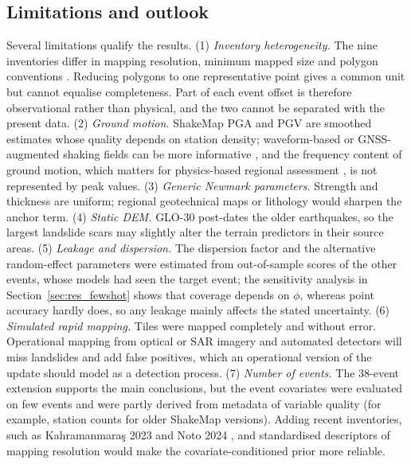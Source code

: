 \subsection{Limitations and outlook}
Several limitations qualify the results. (1) \emph{Inventory heterogeneity.} The nine inventories differ in mapping resolution, minimum mapped size and polygon conventions \citep{tanyas2017}. Reducing polygons to one representative point gives a common unit but cannot equalise completeness. Part of each event offset is therefore observational rather than physical, and the two cannot be separated with the present data. (2) \emph{Ground motion.} ShakeMap PGA and PGV are smoothed estimates whose quality depends on station density; waveform-based or GNSS-augmented shaking fields can be more informative \citep{dahal2024waveform,endo2026realtime}, and the frequency content of ground motion, which matters for physics-based regional assessment \citep{jiang2026frequency}, is not represented by peak values. (3) \emph{Generic Newmark parameters.} Strength and thickness are uniform; regional geotechnical maps or lithology would sharpen the anchor term. (4) \emph{Static DEM.} GLO-30 post-dates the older earthquakes, so the largest landslide scars may slightly alter the terrain predictors in their source areas. (5) \emph{Leakage and dispersion.} The dispersion factor and the alternative random-effect parameters were estimated from out-of-sample scores of the other events, whose models had seen the target event; the sensitivity analysis in Section~\ref{sec:res_fewshot} shows that coverage depends on $\phi$, whereas point accuracy hardly does, so any leakage mainly affects the stated uncertainty. (6) \emph{Simulated rapid mapping.} Tiles were mapped completely and without error. Operational mapping from optical or SAR imagery \citep{williams2018,handwerger2022} and automated detectors \citep{xu2026rapid,fu2026lsdsam,nasios2026multimodal} will miss landslides and add false positives, which an operational version of the update should model as a detection process. (7) \emph{Number of events.} The 38-event extension supports the main conclusions, but the event covariates were evaluated on few events and were partly derived from metadata of variable quality (for example, station counts for older ShakeMap versions). Adding recent inventories, such as Kahramanma\-ra\c{s} 2023 \citep{yilmaz2026kahramanmaras} and Noto 2024 \citep{zhang2025noto}, and standardised descriptors of mapping resolution would make the covariate-conditioned prior more reliable.
